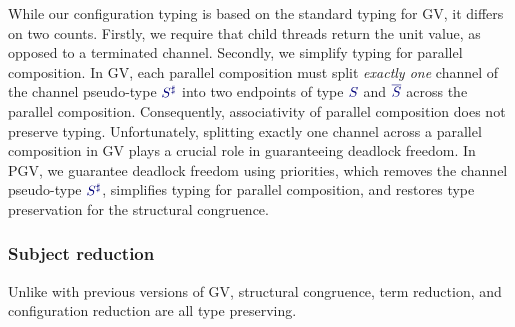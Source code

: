 \documentclass[main.tex]{subfiles}
\begin{document}
While our configuration typing is based on the standard typing for GV, it differs on two counts.
Firstly, we require that child threads return the unit value, as opposed to a terminated channel.
Secondly, we simplify typing for parallel composition. In GV, each parallel composition must split \emph{exactly one} channel of the channel pseudo-type $\ty{S^\sharp}$ into two endpoints of type $\ty{S}$ and $\ty{\co{S}}$ across the parallel composition. Consequently, associativity of parallel composition does not preserve typing. Unfortunately, splitting exactly one channel across a parallel composition in GV plays a crucial role in guaranteeing deadlock freedom. In PGV, we guarantee deadlock freedom using priorities, which removes the channel pseudo-type $\ty{S^\sharp}$, simplifies typing for parallel composition, and restores type preservation for the structural congruence.




\subsubsection*{Subject reduction}
Unlike with previous versions of GV, structural congruence, term reduction, and configuration reduction are all type preserving.
\end{document}
